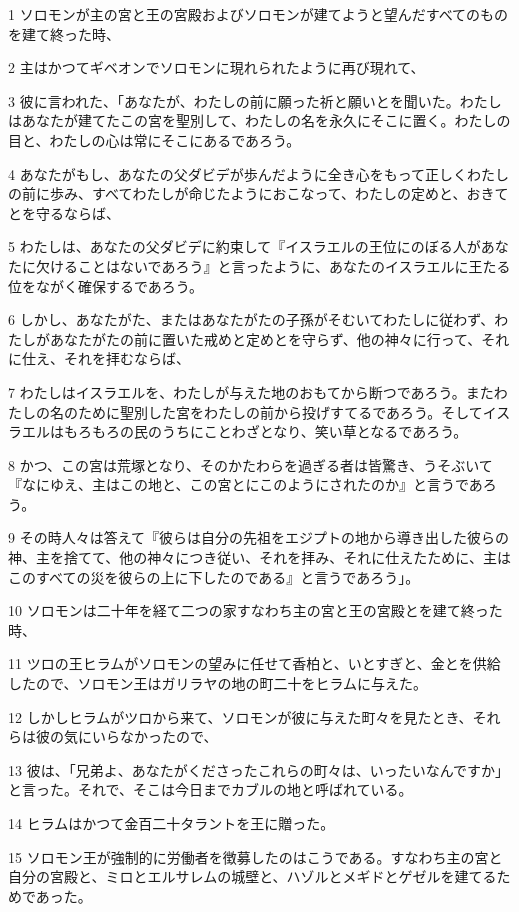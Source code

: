\par 1 ソロモンが主の宮と王の宮殿およびソロモンが建てようと望んだすべてのものを建て終った時、
\par 2 主はかつてギベオンでソロモンに現れられたように再び現れて、
\par 3 彼に言われた、「あなたが、わたしの前に願った祈と願いとを聞いた。わたしはあなたが建てたこの宮を聖別して、わたしの名を永久にそこに置く。わたしの目と、わたしの心は常にそこにあるであろう。
\par 4 あなたがもし、あなたの父ダビデが歩んだように全き心をもって正しくわたしの前に歩み、すべてわたしが命じたようにおこなって、わたしの定めと、おきてとを守るならば、
\par 5 わたしは、あなたの父ダビデに約束して『イスラエルの王位にのぼる人があなたに欠けることはないであろう』と言ったように、あなたのイスラエルに王たる位をながく確保するであろう。
\par 6 しかし、あなたがた、またはあなたがたの子孫がそむいてわたしに従わず、わたしがあなたがたの前に置いた戒めと定めとを守らず、他の神々に行って、それに仕え、それを拝むならば、
\par 7 わたしはイスラエルを、わたしが与えた地のおもてから断つであろう。またわたしの名のために聖別した宮をわたしの前から投げすてるであろう。そしてイスラエルはもろもろの民のうちにことわざとなり、笑い草となるであろう。
\par 8 かつ、この宮は荒塚となり、そのかたわらを過ぎる者は皆驚き、うそぶいて『なにゆえ、主はこの地と、この宮とにこのようにされたのか』と言うであろう。
\par 9 その時人々は答えて『彼らは自分の先祖をエジプトの地から導き出した彼らの神、主を捨てて、他の神々につき従い、それを拝み、それに仕えたために、主はこのすべての災を彼らの上に下したのである』と言うであろう」。
\par 10 ソロモンは二十年を経て二つの家すなわち主の宮と王の宮殿とを建て終った時、
\par 11 ツロの王ヒラムがソロモンの望みに任せて香柏と、いとすぎと、金とを供給したので、ソロモン王はガリラヤの地の町二十をヒラムに与えた。
\par 12 しかしヒラムがツロから来て、ソロモンが彼に与えた町々を見たとき、それらは彼の気にいらなかったので、
\par 13 彼は、「兄弟よ、あなたがくださったこれらの町々は、いったいなんですか」と言った。それで、そこは今日までカブルの地と呼ばれている。
\par 14 ヒラムはかつて金百二十タラントを王に贈った。
\par 15 ソロモン王が強制的に労働者を徴募したのはこうである。すなわち主の宮と自分の宮殿と、ミロとエルサレムの城壁と、ハゾルとメギドとゲゼルを建てるためであった。
